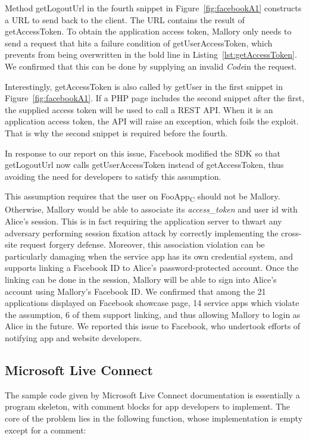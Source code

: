 Method getLogoutUrl in the fourth snippet in Figure~\ref{fig:facebookA1} constructs a URL to send back to the client.  The URL contains the result of getAccessToken.  To obtain the application access token, Mallory only needs to send a request that hits a failure condition of getUserAccessToken, which prevents  from being overwritten in the bold line in Listing~\ref{lst:getAccessToken}.  We confirmed that this can be done by supplying an invalid \emph{Code}in the request. 

Interestingly, getAccessToken is also called by getUser in the first snippet in Figure~\ref{fig:facebookA1}.  If a PHP page includes the second snippet after the first, the supplied access token will be used to call a REST API.  When it is an application access token, the API will raise an exception, which foils the exploit.  That is why the second snippet is required before the fourth.

In response to our report on this issue, Facebook modified the SDK so that getLogoutUrl now calls getUserAccessToken instead of getAccessToken, thus avoiding the need for developers to satisfy this assumption.

  This assumption requires that the user on FooApp\textsubscript{C} should not be Mallory.  Otherwise, Mallory would be able to associate its \emph{access\_token} and user id with Alice's session.  This is in fact requiring the application server to thwart any adversary performing session fixation attack by correctly implementing the cross-site request forgery defense.  Moreover, this association violation can be particularly damaging when the service app has its own credential system, and supports linking a Facebook ID to Alice’s password-protected account.  Once the linking can be done in the session, Mallory will be able to sign into Alice's account using Mallory's Facebook ID.  We confirmed that among the 21 applications displayed on Facebook showcase page, 14 service apps which violate the assumption, 6 of them support linking, and thus allowing Mallory to login as Alice in the future.  We reported this issue to Facebook, who undertook efforts of notifying app and website developers.

\subsection{Microsoft Live Connect}

  The sample code given by Microsoft Live Connect documentation is essentially a program skeleton, with comment blocks for app developers to implement.  The core of the problem lies in the following function, whose implementation is empty except for a comment:

